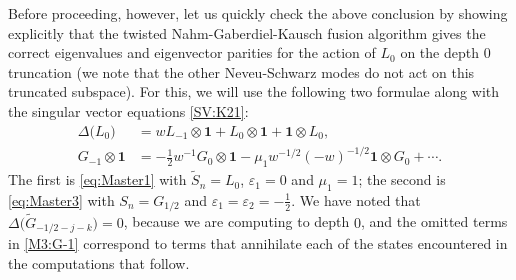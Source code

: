 \documentclass[a4paper,reqno,12pt]{report}
\theoremstyle{definition}
\numberwithin{equation}{section}
\newcommand{\wun}{\mathbf{1}}  %
\newcommand{\coproductsymb}{\Delta}                                                %
\newcommand{\coproduct}[1]{\coproductsymb \bigl( #1 \bigr)}                        %
\newcommand{\sv}{singular vector}
\newcommand{\NGK}{Nahm-Gaberdiel-Kausch}
\newcommand{\ns}{Neveu-Schwarz}
\newcommand{\eps}{\varepsilon}
\newcommand{\tS}{\widetilde{S}}
\theoremstyle{plain}
\newcommand{\tG}{\widetilde{G}}
\begin{document}
Before proceeding, however, let us quickly check the above conclusion by showing explicitly that the twisted \NGK{} fusion algorithm gives the correct eigenvalues and eigenvector parities for the action of $L_0$ on the depth $0$ truncation (we note that the other \ns{} modes do not act on this truncated subspace).  For this, we will use the following two formulae along with the \sv{} equations \eqref{SV:K21}:
\begin{subequations}
\begin{align}
\coproduct{L_0} &= w L_{-1} \otimes \wun + L_0 \otimes \wun + \wun \otimes L_0, \label{M1:L0} \\
G_{-1} \otimes \wun &= -\frac{1}{2} w^{-1} G_0 \otimes \wun -\mu_1 w^{-1/2}(-w)^{-1/2} \wun \otimes G_0 + \cdots. \label{M3:G-1}
\end{align}
\end{subequations}
The first is \eqref{eq:Master1} with $\tS_n = L_0$, $\eps_1 = 0$ and $\mu_1 = 1$; the second is \eqref{eq:Master3} with $S_n = G_{1/2}$ and $\eps_1 = \eps_2 = -\frac{1}{2}$.  We have noted that $\coproduct{\tG_{-1/2-j-k}} = 0$, because we are computing to depth $0$, and the omitted terms in \eqref{M3:G-1} correspond to terms that annihilate each of the states encountered in the computations that follow.
\end{document}
